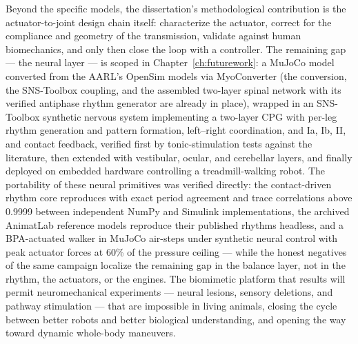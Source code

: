 Beyond the specific models, the dissertation's methodological contribution is the actuator-to-joint design chain itself: characterize the actuator, correct for the compliance and geometry of the transmission, validate against human biomechanics, and only then close the loop with a controller. The remaining gap --- the neural layer --- is scoped in Chapter~\ref{ch:futurework}: a MuJoCo model converted from the AARL's OpenSim models via MyoConverter (the conversion, the SNS-Toolbox coupling, and the assembled two-layer spinal network with its verified antiphase rhythm generator are already in place), wrapped in an SNS-Toolbox synthetic nervous system implementing a two-layer CPG with per-leg rhythm generation and pattern formation, left--right coordination, and Ia, Ib, II, and contact feedback, verified first by tonic-stimulation tests against the literature, then extended with vestibular, ocular, and cerebellar layers, and finally deployed on embedded hardware controlling a treadmill-walking robot. The portability of these neural primitives was verified directly: the contact-driven rhythm core reproduces with exact period agreement and trace correlations above 0.9999 between independent NumPy and Simulink implementations, the archived AnimatLab reference models reproduce their published rhythms headless, and a BPA-actuated walker in MuJoCo air-steps under synthetic neural control with peak actuator forces at 60\% of the pressure ceiling --- while the honest negatives of the same campaign localize the remaining gap in the balance layer, not in the rhythm, the actuators, or the engines. The biomimetic platform that results will permit neuromechanical experiments --- neural lesions, sensory deletions, and pathway stimulation --- that are impossible in living animals, closing the cycle between better robots and better biological understanding, and opening the way toward dynamic whole-body maneuvers.

